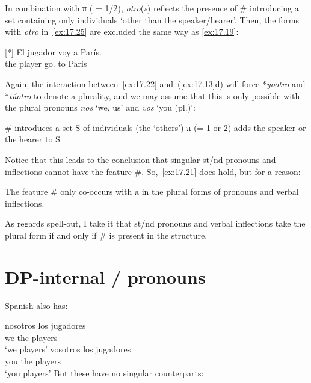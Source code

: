 \documentclass[output=paper]{langsci/langscibook}
\begin{document}
\ea\label{ex:17.26}
    In combination with π ( = 1/2), \emph{otro}(\emph{s}) reflects the presence
    of \# introducing a set containing only individuals ‘other than the
    speaker/hearer’.
\z
Then, the forms with \emph{otro} in~\eqref{ex:17.25} are excluded the same
way as \eqref{ex:17.19}:

\begin{exe}
\exi{\eqref{ex:17.19}}[*]{%
    \gll El jugador voy a París.\\
        the player go.\Fsg{} to Paris\\
    \glt}
\end{exe}
Again, the interaction between~\eqref{ex:17.22} and~(\ref{ex:17.13}d) will
force *\emph{yootro} and *\emph{túotro} to denote a plurality, and we may
assume that this is only possible with the plural pronouns \emph{nos} ‘we, us’
and \emph{vos} ‘you (pl.)’:

\begin{exe}
\exi{\eqref{ex:17.13}}
\begin{xlist}
     \# introduces a set S of individuals (the ‘others’)
     π (= 1 or 2) adds the speaker or the hearer to S
\end{xlist}
\end{exe}
Notice that this leads to the conclusion that singular \First{}st/\Second{}nd
pronouns and inflections cannot have the feature \#. So,~\eqref{ex:17.21} does
hold, but for a reason:

\begin{exe}
\exi{\eqref{ex:17.21}}
    The feature \# only co-occurs with π in the plural forms of pronouns
    and verbal inflections.
\end{exe}
As regards spell-out, I take it that \First{}st/\Second{}nd pronouns and verbal
inflections take the plural form if and only if \# is present in the structure.

\section{DP-internal \First/\Spl{} pronouns}\label{sec:17.6}

Spanish also has:

\ea\label{ex:17.27}
    \ea
    \gll    nosotros los jugadores\\
            we          the players\\
    \glt    \enquote*{we players}
    \ex
    \gll    vosotros los jugadores\\
            you          the players\\
    \glt    \enquote*{you players}
    \z
\z
But these have no singular counterparts:
\end{document}
